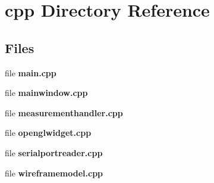 \section{cpp Directory Reference}
\label{dir_df511e5bd85cec96854b39d5e1c27aa8}
\subsection*{Files}
\begin{DoxyCompactItemize}
\item 
file \textbf{ main.\+cpp}
\item 
file \textbf{ mainwindow.\+cpp}
\item 
file \textbf{ measurementhandler.\+cpp}
\item 
file \textbf{ openglwidget.\+cpp}
\item 
file \textbf{ serialportreader.\+cpp}
\item 
file \textbf{ wireframemodel.\+cpp}
\end{DoxyCompactItemize}

